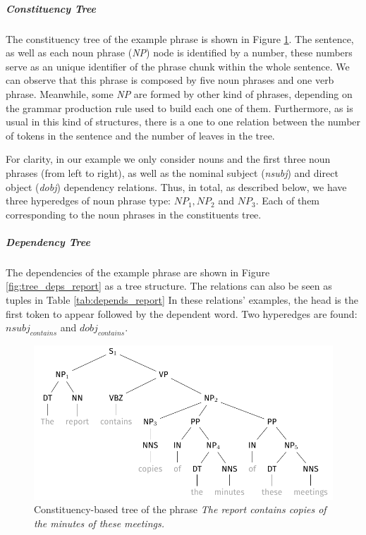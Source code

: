 \subparagraph{Constituency Tree} The constituency tree of the example phrase is shown in Figure \ref{fig:tree_constits}. The sentence, as well as each noun phrase (\textit{NP}) node is identified by a number, these numbers serve as an unique identifier of the phrase chunk within the whole sentence. We can observe that this phrase is composed by five noun phrases and one verb phrase. Meanwhile, some \textit{NP} are formed by other kind of phrases, depending on the grammar production rule used to build each one of them. Furthermore, as is usual in this kind of structures, there is a one to one relation between the number of tokens in the sentence  and the number of leaves in the tree.

For clarity,  in our example we  only consider nouns and the first three noun phrases (from left to right), as well as the nominal subject (\textit{nsubj}) and direct object (\textit{dobj}) dependency relations. Thus, in total, as described below, we have three hyperedges of noun phrase type: $NP_1, NP_2$ and $NP_3$. Each of them corresponding to the noun phrases in the constituents tree.
 
\subparagraph{Dependency Tree}
The dependencies of the example phrase are shown in Figure \ref{fig:tree_deps_report} as a tree structure. The relations can also be seen as tuples in Table \ref{tab:depends_report} In these relations' examples, the head is the first token to appear  followed by the dependent word. Two hyperedges are found: 
$nsubj_{contains}$ and $dobj_{contains}$.
 \begin{figure}
 \centering
 \includegraphics[width=0.7\linewidth]{images/Chapitre3/trees/tree_constits.pdf}
 \caption{Constituency-based tree of the phrase \textit{The report contains copies of the minutes of these meetings.}}
 \label{fig:tree_constits}
 \end{figure}
 
 
